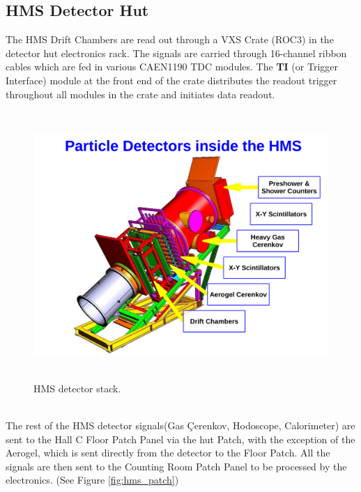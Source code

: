 \documentclass[11pt]{article}
\begin{document}
\subsection{HMS Detector Hut}
The HMS Drift Chambers are read out through a VXS Crate (ROC3) in the detector hut electronics rack. The signals are carried through 16-channel ribbon cables
which are fed in various CAEN1190 TDC modules. The \textbf{TI} (or Trigger Interface) module at the front end of the crate distributes the readout
trigger throughout all modules in the crate and initiates data readout.
\begin{figure}[h!]
  \centering
  \includegraphics[width=5.0in, height=4.0in]{../HMS_stack.pdf}
  \caption{HMS detector stack.}
  \label{fig:hms_stack}
\end{figure}\\
\newpage
\noindent The rest of the HMS detector signals(Gas \c{C}erenkov, Hodoscope, Calorimeter) are
sent to the Hall C Floor Patch Panel via the hut Patch, with the exception
of the Aerogel, which is sent directly from the detector to the Floor Patch.
All the signals are then sent to the Counting Room Patch Panel to be processed
by the electronics. (See Figure \ref{fig:hms_patch})
  
\end{document}
